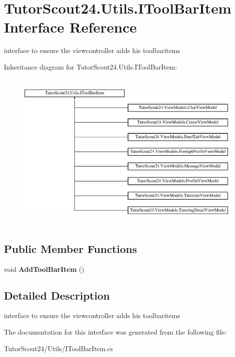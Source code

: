 \hypertarget{interface_tutor_scout24_1_1_utils_1_1_i_tool_bar_item}{}\section{Tutor\+Scout24.\+Utils.\+I\+Tool\+Bar\+Item Interface Reference}
\label{interface_tutor_scout24_1_1_utils_1_1_i_tool_bar_item}


interface to ensure the viewcontroller adds his toolbaritems  


Inheritance diagram for Tutor\+Scout24.\+Utils.\+I\+Tool\+Bar\+Item\+:\begin{figure}[H]
\begin{center}
\leavevmode
\includegraphics[height=7.974683cm]{interface_tutor_scout24_1_1_utils_1_1_i_tool_bar_item}
\end{center}
\end{figure}
\subsection*{Public Member Functions}
\begin{DoxyCompactItemize}
\item 
\mbox{\label{interface_tutor_scout24_1_1_utils_1_1_i_tool_bar_item_a46480b73dc46338a4d00acee24422273}} 
void {\bfseries Add\+Tool\+Bar\+Item} ()
\end{DoxyCompactItemize}


\subsection{Detailed Description}
interface to ensure the viewcontroller adds his toolbaritems 



The documentation for this interface was generated from the following file\+:\begin{DoxyCompactItemize}
\item 
Tutor\+Scout24/\+Utils/I\+Tool\+Bar\+Item.\+cs\end{DoxyCompactItemize}
